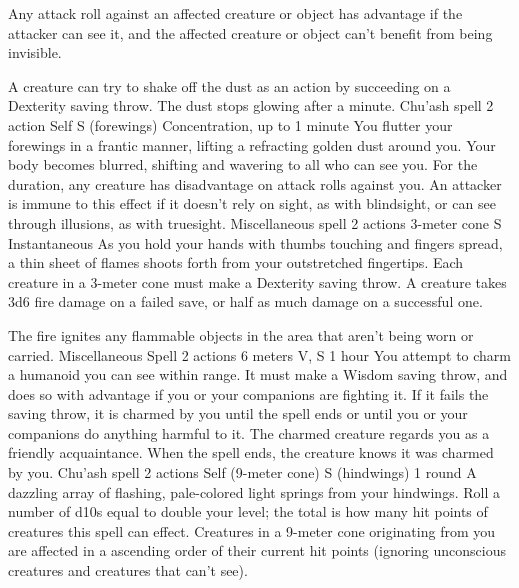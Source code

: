     Any attack roll against an affected creature or object has advantage if the attacker can see it, and the affected creature or object can't benefit from being invisible.

    A creature can try to shake off the dust as an action by succeeding on a Dexterity saving throw.
    The dust stops glowing after a minute.
    {Chu'ash spell}
    {2 action}
    {Self}
    {S (forewings)}
    {Concentration, up to 1 minute}
    You flutter your forewings in a frantic manner, lifting a refracting golden dust around you.
    Your body becomes blurred, shifting and wavering to all who can see you.
    For the duration, any creature has disadvantage on attack rolls against you.
    An attacker is immune to this effect if it doesn't rely on sight, as with blindsight, or can see through illusions, as with truesight.
    {Miscellaneous spell}
    {2 actions}
    {3-meter cone}
    {S}
    {Instantaneous}
    As you hold your hands with thumbs touching and fingers spread, a thin sheet of flames shoots forth from your outstretched fingertips.
    Each creature in a 3-meter cone must make a Dexterity saving throw.
    A creature takes 3d6 fire damage on a failed save, or half as much damage on a successful one.

    The fire ignites any flammable objects in the area that aren't being worn or carried.
    {Miscellaneous Spell}
    {2 actions}
    {6 meters}
    {V, S}
    {1 hour}
    You attempt to charm a humanoid you can see within range.
    It must make a Wisdom saving throw, and does so with advantage if you or your companions are fighting it.
    If it fails the saving throw, it is charmed by you until the spell ends or until you or your companions do anything harmful to it.
    The charmed creature regards you as a friendly acquaintance.
    When the spell ends, the creature knows it was charmed by you.
    {Chu'ash spell}
    {2 actions}
    {Self (9-meter cone)}
    {S (hindwings)}
    {1 round}
    A dazzling array of flashing, pale-colored light springs from your hindwings.
    Roll a number of d10s equal to double your level; the total is how many hit points of creatures this spell can effect.
    Creatures in a 9-meter cone originating from you are affected in a ascending order of their current hit points (ignoring unconscious creatures and creatures that can't see).

